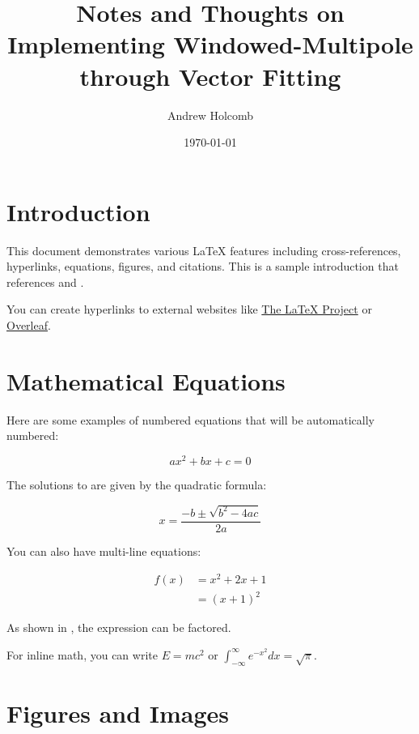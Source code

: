 \documentclass[12pt,a4paper]{article}
\title{Notes and Thoughts on Implementing Windowed-Multipole through Vector Fitting}
\author{Andrew Holcomb}
\date{\today}
\begin{document}
\maketitle

\tableofcontents
\newpage

\section{Introduction}\label{sec:introduction}

This document demonstrates various LaTeX features including cross-references, hyperlinks, equations, figures, and citations. This is a sample introduction that references  and .

You can create hyperlinks to external websites like \href{https://www.latex-project.org/}{The LaTeX Project} or \href{https://www.overleaf.com/}{Overleaf}.

\section{Mathematical Equations}\label{sec:equations}

Here are some examples of numbered equations that will be automatically numbered:

\begin{equation}\label{eq:quadratic}
ax^2 + bx + c = 0
\end{equation}

The solutions to  are given by the quadratic formula:

\begin{equation}\label{eq:quadratic-formula}
x = \frac{-b \pm \sqrt{b^2 - 4ac}}{2a}
\end{equation}

You can also have multi-line equations:

\begin{align}\label{eq:multi-line}
f(x) &= x^2 + 2x + 1 \\
&= (x + 1)^2 \label{eq:factored}
\end{align}

As shown in , the expression can be factored.

For inline math, you can write $E = mc^2$ or $\int_{-\infty}^{\infty} e^{-x^2} dx = \sqrt{\pi}$.

\section{Figures and Images}\label{sec:figures}
\end{document}
